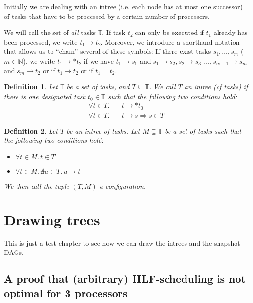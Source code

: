 \documentclass[letter]{report}
\newtheorem{definition}{Definition}[chapter]
\newcommand{\alltasks}{{\mathbb T}}
\newcommand{\neededfor}{\rightarrow}
\begin{document}
Initially we are dealing with an intree (i.e. each node has at most one successor) of tasks that have to be processed by a certain number of processors.

We will call the set of \emph{all} tasks $\alltasks$. If task $t_2$ can only be executed if $t_1$ already has been processed, we write $t_1 \neededfor t_2$. Moreover, we introduce a shorthand notation that allows us to ``chain'' several of these symbols: If there exist tasks $s_1,\dots,s_m$ ($m\in\mathbb N$), we write $t_1 \neededfor* t_2$ if we have $t_1 \neededfor s_1$ and $s_1 \neededfor s_2, s_2 \neededfor s_3, \dots, s_{m-1} \neededfor s_m$ and $s_m \neededfor t_2$ or if $t_1\neededfor t_2$ or if $t_1=t_2$.

\begin{definition}
  Let $\alltasks$ be a set of tasks, and $T \subseteq \alltasks$. We call $T$ an intree (of tasks) if there is one designated task $t_0\in\alltasks$ such that the following two conditions hold:
  \begin{eqnarray*}
    \forall  t \in T. & \quad t \neededfor* t_0 \\
    \forall  t \in T. & \quad t\neededfor s \Rightarrow s\in T
  \end{eqnarray*}
\end{definition}

\begin{definition}
  Let $T$ be an intree of tasks. Let $M\subseteq\alltasks$ be a set of tasks such that the following two conditions hold:
  \begin{itemize}
  \item $\forall t\in M.\, t \in T$
  \item $\forall t\in M.\, \nexists u \in T.\, u\neededfor t $
  \end{itemize}
  We then call the tuple $\left( T, M \right)$ a \emph{configuration}.
\end{definition}

\chapter{Drawing trees}
\label{chap:drawing-trees}

This is just a test chapter to see how we can draw the intrees and the snapshot DAGs.
\newsavebox{\nodebox}

\section{A proof that (arbitrary) HLF-scheduling is not optimal for 3 processors}
\label{sec:arb-hlf-not-optimal-for-3-procs}
\end{document}
